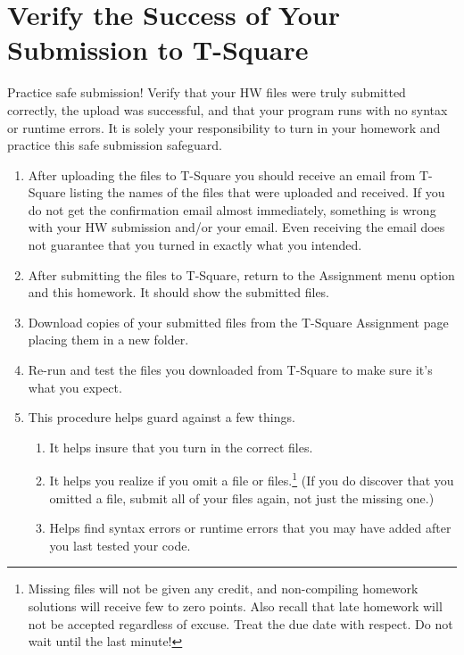 \documentclass[12pt]{article}
\begin{document}
\section{Verify the Success of Your Submission to T-Square}

Practice safe submission! Verify that your HW files were truly submitted correctly, the upload was successful, and that your program runs with no syntax or runtime errors. It is solely your responsibility to turn in your homework and practice this safe submission safeguard.

\begin{enumerate}
\itemsep0em
\item After uploading the files to T-Square you should receive an email from T-Square listing the names of the files that were uploaded and received. If you do not get the confirmation email almost immediately, something is wrong with your HW submission and/or your email. Even receiving the email does not guarantee that you turned in exactly what you intended.
\item After submitting the files to T-Square, return to the Assignment menu option and this homework. It should show the submitted files.
\item Download copies of your submitted files from the T-Square Assignment page placing them in a new folder.
\item Re-run and test the files you downloaded from T-Square to make sure it's what you expect.
\item This procedure helps guard against a few things.
\begin{enumerate}
\itemsep0em
\item It helps insure that you turn in the correct files.
\item It helps you realize if you omit a file or files.\footnote{Missing files will not be given any credit, and non-compiling homework solutions will receive few to zero points. Also recall that late homework will not be accepted regardless of excuse. Treat the due date with respect.  Do not wait until the last minute!}
(If you do discover that you omitted a file, submit all of your files again, not just the missing one.)
\item Helps find syntax errors or runtime errors that you may have added after you last tested your code.
\end{enumerate}
\end{enumerate}
\end{document}
